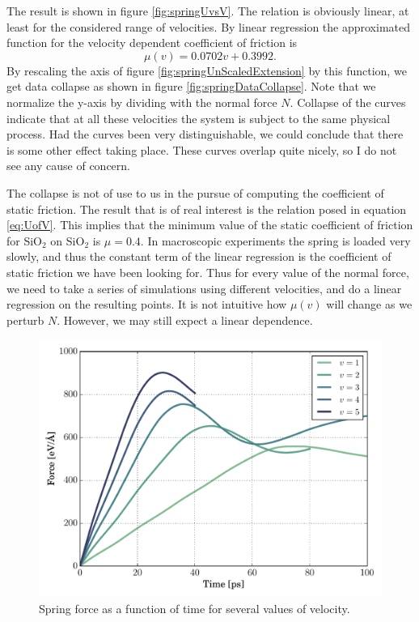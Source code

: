 \documentclass[twoside,english]{uiofysmaster}
\begin{document}
The result is shown in figure \ref{fig:springUvsV}. 
The relation is obviously linear, at least for the considered range of velocities. By linear regression the approximated function for the velocity dependent coefficient of friction is 
\begin{equation}\label{eq:UofV}
	\mu(v) = 0.0702v + 0.3992.
\end{equation}
By rescaling the axis of figure \ref{fig:springUnScaledExtension} 
by this function, we get data collapse as shown in figure \ref{fig:springDataCollapse}. Note that we normalize the y-axis by dividing with the normal force $N$.
Collapse of the curves indicate that at all these velocities the system is subject to the same physical process. Had the curves been very distinguishable, we could conclude that there is some other effect taking place. These curves overlap quite nicely, so I do not see any cause of concern. 

The collapse is not of use to us in the pursue of computing the coefficient of static friction. 
The result that is of real interest is the relation posed in equation \eqref{eq:UofV}. 
This implies that the minimum value of the static coefficient of friction for SiO$_2$ on SiO$_2$ is $\mu = 0.4$. In macroscopic experiments the spring is loaded very slowly, and thus the constant term of the linear regression is the coefficient of static friction we have been looking for.
Thus for every value of the normal force, we need to take a series of simulations using different velocities, and do a linear regression on the resulting points. It is not intuitive how $\mu(v)$ will change as we perturb $N$. However, we may still expect a linear dependence. 

\begin{figure}[H]
\centering
\includegraphics[width=0.7\linewidth]{figures/friction/scalingCoeffisient/UnScaledSliding}
\caption{Spring force as a function of time for several values of velocity.}
\label{fig:springUnScaled}
\end{figure}
\end{document}
